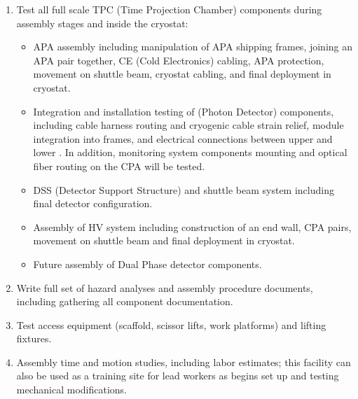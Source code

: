 \begin{enumerate}
\item Test all full scale TPC (Time Projection Chamber) components during assembly stages and inside the cryostat:  
\begin{itemize}
    \item APA  assembly including manipulation of APA shipping frames, joining an APA pair together, CE (Cold Electronics) cabling, APA protection, movement on shuttle beam, cryostat cabling, and final deployment in cryostat. 
    \item Integration and installation testing of  (Photon Detector) components, including cable harness routing and cryogenic cable strain relief, module integration into  frames, and electrical connections between upper and lower .  In addition,  monitoring system components mounting and optical fiber routing on the CPA will be tested.
    \item DSS (Detector Support Structure) and shuttle beam system including final detector configuration.
    \item Assembly of HV system including construction of an end wall, CPA pairs, movement on shuttle beam and final deployment in cryostat.
    \item Future assembly of Dual Phase detector components.
\end{itemize}
\item Write full set of hazard analyses and assembly procedure documents, including gathering all component documentation. 
\item Test access equipment (scaffold, scissor lifts, work platforms) and lifting fixtures. 
\item Assembly time and motion studies, including labor estimates;
this facility can also be used as a training site for lead workers as  begins set up and testing mechanical modifications.
\end{enumerate}

